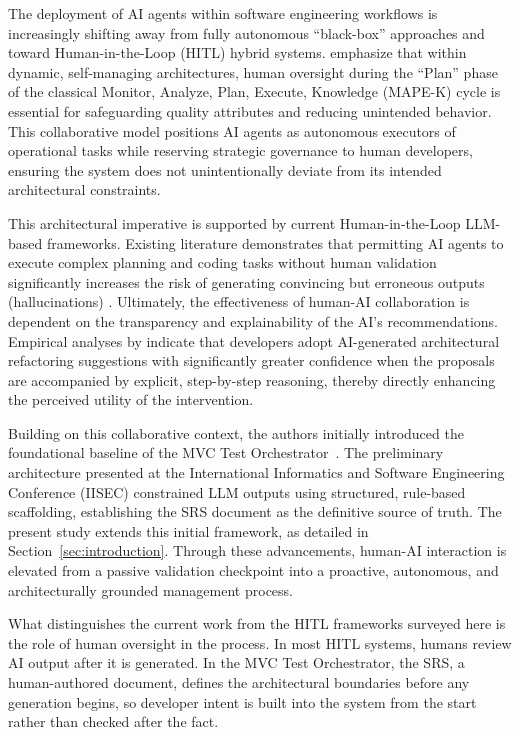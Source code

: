 The deployment of AI agents within software engineering workflows is
increasingly shifting away from fully autonomous ``black-box''
approaches and toward Human-in-the-Loop (HITL) hybrid systems. \citet{Sera2025} emphasize that within dynamic,
self-managing architectures, human oversight during the ``Plan''
phase of the classical Monitor, Analyze, Plan, Execute,
Knowledge (MAPE-K) cycle \citep{Kephart2003} is essential for safeguarding
quality attributes and reducing unintended behavior. This
collaborative model positions AI agents as autonomous executors of
operational tasks while reserving strategic governance to human
developers, ensuring the system does not unintentionally deviate from
its intended architectural constraints.

This architectural imperative is supported by current Human-in-the-Loop
LLM-based frameworks. Existing literature demonstrates that permitting
AI agents to execute complex planning and coding tasks without human
validation significantly increases the risk of generating convincing
but erroneous outputs (hallucinations) \citep{Ji2023}.
Ultimately, the effectiveness of human-AI collaboration is dependent
on the transparency and explainability of the AI's recommendations.
Empirical analyses by \citet{Pandini2025} indicate that
developers adopt AI-generated architectural refactoring suggestions
with significantly greater confidence when the proposals are
accompanied by explicit, step-by-step reasoning, thereby directly
enhancing the perceived utility of the intervention.

Building on this collaborative context, the authors initially
introduced the foundational baseline of the MVC Test
Orchestrator~\citep{dim2026mvc}. The preliminary architecture presented at the
International Informatics and Software Engineering Conference (IISEC) constrained LLM outputs using structured, rule-based
scaffolding, establishing the SRS document as the definitive source of
truth. The present study extends this initial framework, as detailed in
Section~\ref{sec:introduction}. Through these advancements, human-AI
interaction is elevated from a passive validation checkpoint into a
proactive, autonomous, and architecturally grounded management process.

What distinguishes the current work from the HITL frameworks surveyed
here is the role of human oversight in the process. In most HITL
systems, humans review AI output after it is generated. In the MVC
Test Orchestrator, the SRS, a human-authored document, defines the
architectural boundaries before any generation begins, so developer
intent is built into the system from the start rather than checked
after the fact.

